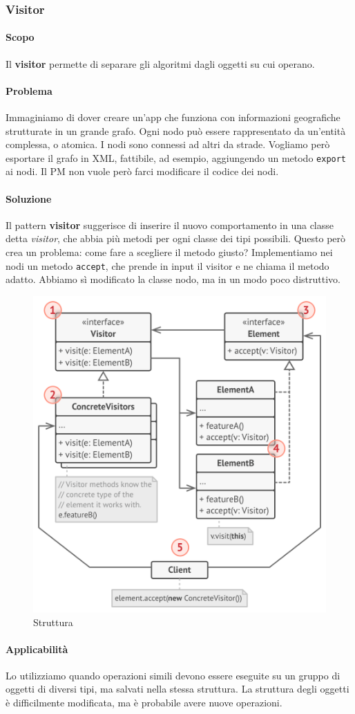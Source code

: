 \documentclass[11pt]{article}
\newcommand{\code}[1]{\texttt{#1}}
\begin{document}
\subsubsection{Visitor}
\paragraph{Scopo}
Il \textbf{visitor} permette di separare gli algoritmi dagli oggetti su cui operano. 
\paragraph{Problema}
Immaginiamo di dover creare un'app che funziona con informazioni geografiche strutturate in un grande grafo. Ogni nodo può essere rappresentato da un'entità complessa, o atomica. I nodi sono connessi ad altri da strade. Vogliamo però esportare il grafo in XML, fattibile, ad esempio, aggiungendo un metodo \code{export} ai nodi. Il PM non vuole però farci modificare il codice dei nodi. 
\paragraph{Soluzione}
Il pattern \textbf{visitor} suggerisce di inserire il nuovo comportamento in una classe detta \textit{visitor}, che abbia più metodi per ogni classe dei tipi possibili. Questo però crea un problema: come fare a scegliere il metodo giusto? Implementiamo nei nodi un metodo \code{accept}, che prende in input il visitor e ne chiama il metodo adatto. Abbiamo sì modificato la classe nodo, ma in un modo poco distruttivo. 
\begin{figure}[H]
    \includegraphics[width=\linewidth]{res/teoria/Visitor.png}
    \caption{Struttura}
\end{figure}
\paragraph{Applicabilità}
Lo utilizziamo quando operazioni simili devono essere eseguite su un gruppo di oggetti di diversi tipi, ma salvati nella stessa struttura. La struttura degli oggetti è difficilmente modificata, ma è probabile avere nuove operazioni. 
\printglossary
\end{document}
